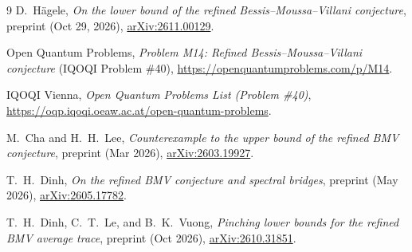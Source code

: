 \documentclass[11pt,a4paper]{article}
\theoremstyle{remark}
\begin{document}
\begin{thebibliography}{9}
D.~H\"agele, \emph{On the lower bound of the refined Bessis--Moussa--Villani conjecture}, preprint (Oct 29, 2026), \href{https://arxiv.org/html/2611.00129v1}{arXiv:2611.00129}.

Open Quantum Problems, \emph{Problem M14: Refined Bessis--Moussa--Villani conjecture} (IQOQI Problem \#40), \url{https://openquantumproblems.com/p/M14}.

IQOQI Vienna, \emph{Open Quantum Problems List (Problem \#40)}, \url{https://oqp.iqoqi.oeaw.ac.at/open-quantum-problems}.

M.~Cha and H.~H.~Lee, \emph{Counterexample to the upper bound of the refined BMV conjecture}, preprint (Mar 2026), \href{https://arxiv.org/abs/2603.19927}{arXiv:2603.19927}.

T.~H.~Dinh, \emph{On the refined BMV conjecture and spectral bridges}, preprint (May 2026), \href{https://arxiv.org/html/2605.17782v1}{arXiv:2605.17782}.

T.~H.~Dinh, C.~T.~Le, and B.~K.~Vuong, \emph{Pinching lower bounds for the refined BMV average trace}, preprint (Oct 2026), \href{https://arxiv.org/html/2610.31851v1}{arXiv:2610.31851}.
\end{thebibliography}
\end{document}
